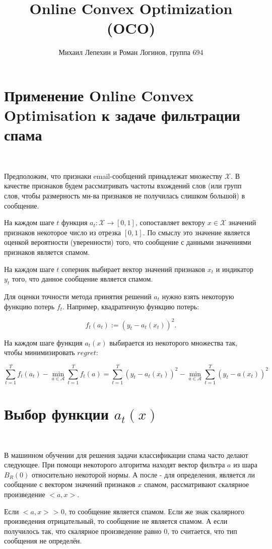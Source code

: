 \documentclass[12pt]{article}
\author{Михаил Лепехин и Роман Логинов, группа 694}
\title{Online Convex Optimization (OCO)}
\begin{document}
  \maketitle

\section*{Применение Online Convex Optimisation к задаче фильтрации спама}
$ $

Предположим, что признаки email-сообщений принадлежат множеству $\mathcal{X}$. В качестве признаков будем рассматривать частоты вхождений слов (или групп слов, чтобы размерность мн-ва признаков не получилась слишком большой) в сообщение.

На каждом шаге $t$ функция $a_t : \mathcal{X} \rightarrow [0, 1]$, сопоставляет вектору $x \in \mathcal{X}$ значений признаков некоторое число из отрезка $[0, 1]$. По смыслу это значение является оценкой вероятности (уверенности) того, что сообщение с данными значениями признаков является спамом.

На каждом шаге $t$ соперник выбирает вектор значений признаков $x_t$ и индикатор $y_t$ того, что данное сообщение является спамом.

Для оценки точности метода принятия решений $a_t$ нужно взять некоторую функцию потерь $f_t$. Например, квадратичную функцию потерь:

$$f_t(a_t) := (y_t-a_t(x_t))^2.$$

На каждом шаге функция $a_t(x)$ выбирается из некоторого множества так, чтобы минимизировать $regret$:

$$\sum\limits_{t=1}^T f_t(a_t) - \min\limits_{a \in \mathcal{A}} \sum\limits_{t=1}^T f_t(a) = \sum\limits_{t=1}^T (y_t-a_t(x_t))^2 - \min\limits_{a \in \mathcal{A}} \sum\limits_{t=1}^T (y_t-a(x_t))^2$$

\section*{Выбор функции $a_t(x)$}
$ $


В машинном обучении для решения задачи классификации спама часто делают следующее. При помощи некоторого алгоритма находят вектор фильтра $a$ из шара $B_R(0)$ относительно некоторой нормы. А после - для определения, является ли сообщение с вектором значений признаков $x$ спамом, рассматривают скалярное произведение $<a, x>$.

Если $<a, x>$ > 0, то сообщение является спамом. Если же знак скалярного произведения отрицательный, то сообщение не является спамом. А если получилось так, что скалярное произведение равно 0, то считается, что тип сообщения не определён.
\end{document}
